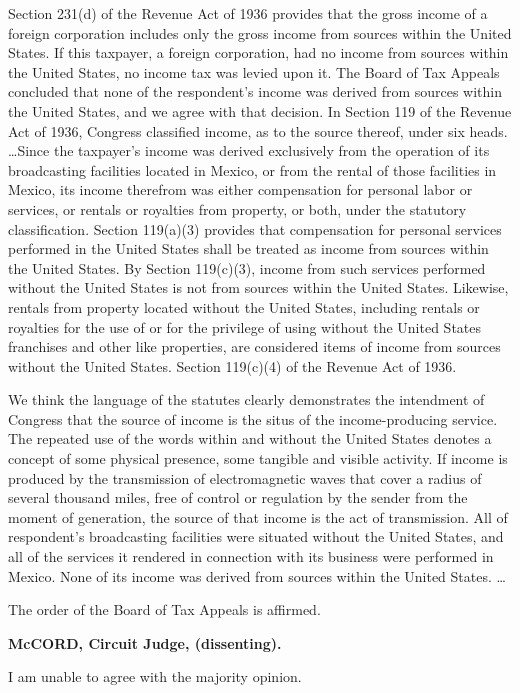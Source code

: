 \begin{select}
Section 231(d) of the Revenue Act of 1936 provides that the gross income of a foreign corporation includes only the gross income from sources within the United States. If this taxpayer, a foreign corporation, had no income from sources within the United States, no income tax was levied upon it. The Board of Tax Appeals concluded that none of the respondent's income was derived from sources within the United States, and we agree with that decision.
In Section 119 of the Revenue Act of 1936, Congress classified income, as to the source thereof, under six heads. \ldots Since the taxpayer's income was derived exclusively from the operation of its broadcasting facilities located in Mexico, or from the rental of those facilities in Mexico, its income therefrom was either compensation for personal labor or services, or rentals or royalties from property, or both, under the statutory classification. Section 119(a)(3) provides that compensation for personal services performed in the United States shall be treated as income from sources within the United States. By Section 119(c)(3), income from such services performed without the United States is not from sources within the United States. Likewise, rentals from property located without the United States, including rentals or royalties for the use of or for the privilege of using without the United States franchises and other like properties, are considered items of income from sources without the United States. Section 119(c)(4) of the Revenue Act of 1936.

We think the language of the statutes clearly demonstrates the intendment of Congress that the source of income is the situs of the income-producing service. The repeated use of the words within and without the United States denotes a concept of some physical presence, some tangible and visible activity. If income is produced by the transmission of electromagnetic waves that cover a radius of several thousand miles, free of control or regulation by the sender from the moment of generation, the source of that income is the act of transmission. All of respondent's broadcasting facilities were situated without the United States, and all of the services it rendered in connection with its business were performed in Mexico. None of its income was derived from sources within the United States. \ldots

The order of the Board of Tax Appeals is affirmed.

\textbf{McCORD, Circuit Judge, (dissenting).}

I am unable to agree with the majority opinion.


\end{select}
